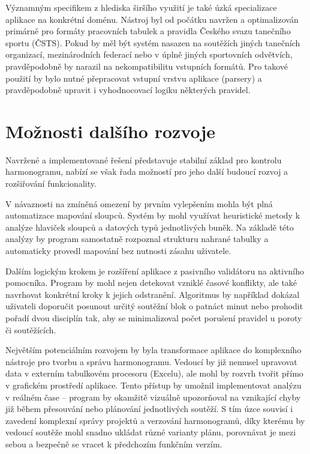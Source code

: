 \documentclass[czech, kiv, ba, he, iso690alph, pdf]{fasthesis}
\begin{document}
			Významným specifikem z hlediska širšího využití je také úzká specializace aplikace na konkrétní doménu. Nástroj byl od počátku navržen a optimalizován primárně pro formáty pracovních tabulek a pravidla Českého svazu tanečního sportu (ČSTS). Pokud by měl být systém nasazen na soutěžích jiných tanečních organizací, mezinárodních federací nebo v úplně jiných sportovních odvětvích, pravděpodobně by narazil na nekompatibilitu vstupních formátů. Pro takové použití by bylo nutné přepracovat vstupní vrstvu aplikace (parsery) a pravděpodobně upravit i vyhodnocovací logiku některých pravidel.
	
		\section{Možnosti dalšího rozvoje}
			Navržené a implementované řešení představuje stabilní základ pro kontrolu harmonogramu, nabízí se však řada možností pro jeho další budoucí rozvoj a rozšiřování funkcionality.
	
			V návaznosti na zmíněná omezení by prvním vylepšením mohla být plná automatizace mapování sloupců. Systém by mohl využívat heuristické metody k analýze hlaviček sloupců a datových typů jednotlivých buněk. Na základě této analýzy by program samostatně rozpoznal strukturu nahrané tabulky a automaticky provedl mapování bez nutnosti zásahu uživatele.
	
			Dalším logickým krokem je rozšíření aplikace z pasivního validátoru na aktivního pomocníka. Program by mohl nejen detekovat vzniklé časové konflikty, ale také navrhovat konkrétní kroky k jejich odstranění. Algoritmus by například dokázal uživateli doporučit posunout určitý soutěžní blok o patnáct minut nebo prohodit pořadí dvou disciplín tak, aby se minimalizoval počet porušení pravidel u poroty či soutěžících.
	
			Největším potenciálním rozvojem by byla transformace aplikace do komplexního nástroje pro tvorbu a správu harmonogramu. Vedoucí by již nemusel upravovat data v externím tabulkovém procesoru (Excelu), ale mohl by rozvrh tvořit přímo v grafickém prostředí aplikace. Tento přístup by umožnil implementovat analýzu v reálném čase – program by okamžitě vizuálně upozorňoval na vznikající chyby již během přesouvání nebo plánování jednotlivých soutěží. S tím úzce souvisí i zavedení komplexní správy projektů a verzování harmonogramů, díky kterému by vedoucí soutěže mohl snadno ukládat různé varianty plánu, porovnávat je mezi sebou a bezpečně se vracet k předchozím funkčním verzím.
\end{document}
